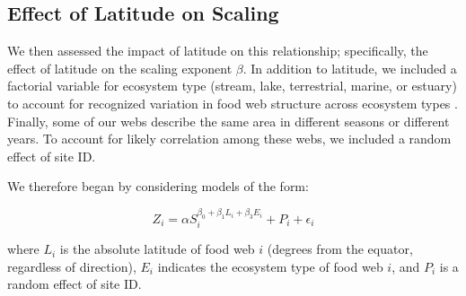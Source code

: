 \documentclass[12pt]{article}
\begin{document}





\subsection*{Effect of Latitude on Scaling}



We then assessed
the impact of latitude on this relationship; specifically, the effect of latitude on the scaling exponent $\beta$. 
In addition to latitude, we included a factorial variable for ecosystem type (stream, lake, terrestrial, marine, or estuary) to account for recognized variation in food web structure across ecosystem types \citep{}.
Finally, some of our webs describe the same area in different
seasons or different years. To account for likely correlation among these webs, we included a random effect of site ID.


We therefore began by considering models of the form:

\begin{equation}
\label{PowerLat}
Z_{i}=\alpha S_{i}^{\beta_{0}+\beta_{1}L_{i}+\beta_{3}E_{i}} + P_{i} + \epsilon_{i} 
\end{equation}

where $L_{i}$ is the absolute latitude of food web $i$ (degrees from the equator, regardless of direction),
$E_{i}$ indicates the ecosystem type of food web $i$, and $P_{i}$ is a random effect of 
site ID.
\end{document}
